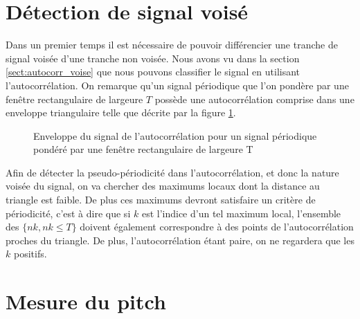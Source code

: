 \documentclass[french]{article}
\begin{document}
\section{Détection de signal voisé}

Dans un premier temps il est nécessaire de pouvoir différencier une tranche de signal voisée d'une tranche non voisée. Nous avons vu dans la section \ref{sect:autocorr_voise} que nous pouvons classifier le signal en utilisant l'autocorrélation. On remarque qu'un signal périodique que l'on pondère par une fenêtre rectangulaire de largeure $T$ possède une autocorrélation comprise dans une enveloppe triangulaire telle que décrite par la figure \ref{fig:enveloppe}.

\begin{figure}[h!]
	\centering
	\caption[Enveloppe de l'autocorrélation]{Enveloppe du signal de l'autocorrélation pour un signal périodique pondéré par une fenêtre rectangulaire de largeure T}
	\label{fig:enveloppe}
\end{figure}

Afin de détecter la pseudo-périodicité dans l'autocorrélation, et donc la nature voisée du signal, on va chercher des maximums locaux dont la distance au triangle est faible. De plus ces maximums devront satisfaire un critère de périodicité, c'est à dire que si $k$ est l'indice d'un tel maximum local, l'ensemble des $\{nk, nk \leq T\}$ doivent également correspondre à des points de l'autocorrélation proches du triangle. De plus, l'autocorrélation étant paire, on ne regardera que les $k$ positifs.

\section{Mesure du pitch}
\end{document}
